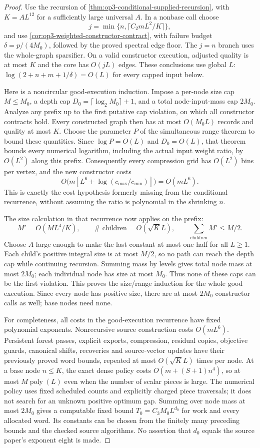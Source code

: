 \begin{proof}
Use the recursion of \cref{thm:op3-conditional-supplied-recursion},
with $K=A L^{12}$ for a sufficiently large universal $A$. In a nonbase
call choose
\[
 j=\min\{n,\lceil C_2mL^2/K\rceil\},
\]
and use \cref{cor:op3-weighted-constructor-contract}, with failure budget
$\delta=p/(4M_0)$, followed by the proved spectral edge floor.
The $j=n$ branch uses the whole-graph sparsifier. On a valid constructor
execution, adjusted quality is at most $K$ and the core has
$O(jL)$ edges. These conclusions use global $L$:
$\log(2+n+m+1/\delta)=O(L)$ for every capped input below.

Here is a noncircular good-execution induction. Impose a per-node size
cap $M\leq M_0$, a depth cap $D_0=\lceil\log_2 M_0\rceil+1$,
and a total node-input-mass cap $2M_0$. Analyze any prefix up to the
first putative cap violation, on which all constructor contracts hold.
Every constructed graph then has at most $O(M_0L)$ records and quality
at most $K$. Choose the parameter $P$ of the simultaneous range theorem
to bound these quantities. Since $\log P=O(L)$ and $D_0=O(L)$,
that theorem bounds every numerical logarithm, including the actual
input weight ratio, by $O(L^2)$ along this prefix.
Consequently every compression grid has $O(L^2)$ bins per vertex,
and the new constructor costs
\[
 O\bigl(m[L^6+\log(c_{\max}/c_{\min})]\bigr)=O(mL^6).
\]
This is exactly the cost hypothesis formerly missing from the conditional
recurrence, without assuming the ratio is polynomial in the shrinking $n$.

The size calculation in that recurrence now applies on the prefix:
\[
 M'=O(ML^4/K),\qquad
 \#\text{ children}=O(\sqrt K L),\qquad
 \sum_{\text{children}}M'\leq M/2.
\]
Choose $A$ large enough to make the last constant at most one half for
all $L\geq1$. Each child's positive integral size is at most $M/2$,
so no path can reach the depth cap while continuing recursion.
Summing mass by levels gives total node mass at most $2M_0$; each
individual node has size at most $M_0$. Thus none of these caps can be
the first violation. This proves the size/range induction for the whole
good execution. Since every node has positive size, there are at most
$2M_0$ constructor calls as well; base nodes need none.

For completeness, all costs in the good-execution recurrence have fixed
polynomial exponents. Nonrecursive source construction costs $O(mL^6)$.
Persistent forest passes, explicit exports, compression, residual copies,
objective guards, canonical shifts, recoveries and source-vector updates
have their previously proved word bounds, repeated at most
$O(\sqrt K L)$ times per node. At a base node $n\leq K$, the exact
dense policy costs $O(m+(S+1)n^4)$, so at most
$M\operatorname{poly}(L)$ even when the number of scalar pieces is large.
The numerical policy uses fixed scheduled counts and explicitly charged
piece traversals; it does not search for an unknown positive optimum gap.
Summing over node mass at most $2M_0$ gives a computable fixed bound
$T_0=C_3M_0L^{d_0}$ for work and every allocated word. Its constants can
be chosen from the finitely many preceding bounds and the checked source
algorithms. No assertion that $d_0$ equals the source paper's exponent
eight is made.


\end{proof}

